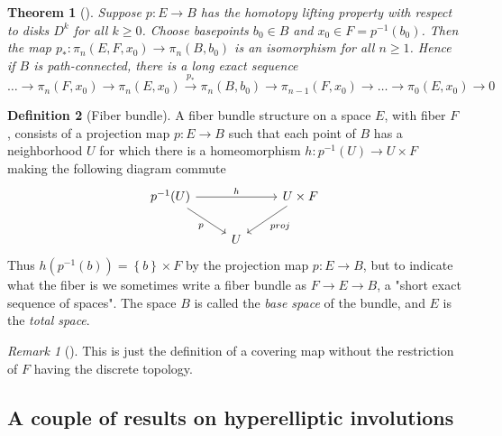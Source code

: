 \documentclass[reqno]{amsart}
\newtheorem{theorem}{Theorem}[section]
\theoremstyle{definition}
\newtheorem{definition}[theorem]{Definition}
\theoremstyle{remark}
\newtheorem*{remark}{Remark}
\begin{document}
\begin{theorem}[]
    Suppose $p \colon E \to B$ has the homotopy
    lifting property with respect to disks
    $D^{k}$ for all $k \ge 0$. Choose basepoints
    $b_0 \in B$ and
    $x_0 \in F = p^{-1}\left( b_0 \right) $. Then
    the map $p_* \colon \pi_n \left( E, F,x_0 \right) 
    \to \pi_n \left( B, b_0 \right) $ is an isomorphism
    for all $n\ge 1$. Hence if $B$ is
    path-connected, there is a long exact sequence
    \[
    \ldots \to \pi_n \left( F,x_0 \right) \to 
    \pi_n \left( E,x_0 \right) \stackrel{p_*}{\to }
    \pi_n \left( B,b_0 \right) \to 
    \pi_{n-1}(F,x_0) \to \ldots \to 
    \pi_0 \left( E,x_0 \right) \to 0
    \] 
\end{theorem}




\begin{definition}[Fiber bundle]
    A fiber bundle structure on a space $E$, with fiber
    $F$, consists of a projection map
    $p \colon E \to B$ such that each point of $B$ has
    a neighborhood $U$ for which there is a homeomorphism
    $h \colon p^{-1}(U) \to U \times F$ making
    the following diagram commute
    \begin{equation*}
    \begin{tikzcd}
        p^{-1}(U) \ar[rr, "h"] \ar[dr, "p"'] & & U \times F
        \ar[dl, "proj"] \\
                                            & U&
    \end{tikzcd}
    \end{equation*}
    Thus
    $h \left( p^{-1}(b) \right) 
    = \left\{ b \right\} \times F$ by the projection map 
    $p \colon E \to B$, but to indicate what the fiber
    is we sometimes write a fiber bundle as
    $F \to E \to B$, a "short exact sequence of spaces".
    The space $B$ is called the \textit{base space} of the
    bundle, and $E$ is the \textit{total space}.
\end{definition}          

\begin{remark}[]
    This is just the definition of a covering map
    without the restriction of $F$ having the discrete
    topology.
\end{remark}
          
\subsection{A couple of results on hyperelliptic involutions}
\end{document}
